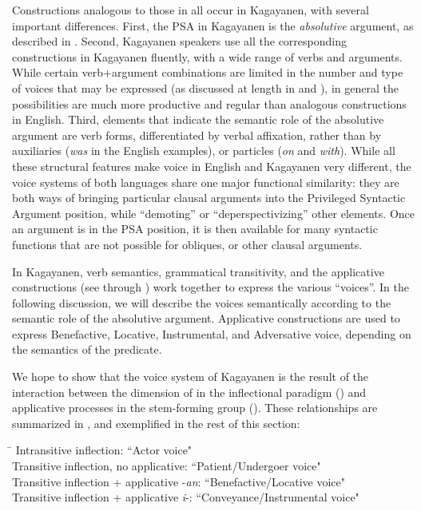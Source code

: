 Constructions analogous to those in  all occur in Kagayanen, with several important differences. First, the PSA in Kagayanen is the \textit{absolutive} argument, as described in . Second, Kagayanen speakers use all the corresponding constructions in Kagayanen fluently, with a wide range of verbs and arguments. While certain verb+argument combinations are limited in the number and type of voices that may be expressed (as discussed at length in  and ), in general the possibilities are much more productive and regular than analogous constructions in English. Third, elements that indicate the semantic role of the absolutive argument are verb forms, differentiated by verbal affixation, rather than by auxiliaries (\textit{was} in the English examples), or particles (\textit{on} and \textit{with}). While all these structural features make voice in English and Kagayanen very different, the voice systems of both languages share one major functional similarity: they are both ways of bringing particular clausal arguments into the Privileged Syntactic Argument position, while “demoting” or “deperspectivizing” other elements. Once an argument is in the PSA position, it is then available for many syntactic functions that are not possible for obliques, or other clausal arguments.  

In Kagayanen, verb semantics, grammatical transitivity, and the applicative constructions (see  through ) work together to express the various “voices”.  In the following discussion, we will describe the voices semantically according to the semantic role of the absolutive argument. Applicative constructions are used to express Benefactive, Locative, Instrumental, and Adversative voice, depending on the semantics of the predicate.

\largerpage
We hope to show that the voice system of Kagayanen is the result of the interaction between the dimension of  in the inflectional paradigm () and applicative processes in the stem-forming group (). These relationships are summarized in , and exemplified in the rest of this section:

\ea
\label{ex:voices}
\begin{tabbing}
\hspace{6.1cm} \= \kill    
Intransitive inflection: \>	“Actor voice" \\
Transitive inflection, no applicative: \>	“Patient/Undergoer voice" \\
Transitive inflection + applicative -\textit{an}:	\> “Benefactive/Locative voice" \\
Transitive inflection + applicative \textit{i}-: 	\> “Conveyance/Instrumental voice"
\end{tabbing}
\z


